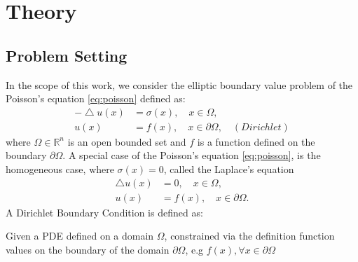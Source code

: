 \chapter{Theory}
\label{chapter:Theory}
%

\section{Problem Setting}
In the scope of this work, we consider the elliptic boundary value problem of
the Poisson's equation
\eqref{eq:poisson} defined as:
  \begin{equation}
    \begin{aligned}
  - \bigtriangleup u(x) &= \sigma(x),\quad x \in \Omega,
  \label{eq:poisson}
  \\ u(x) &= f(x),\quad x \in \partial \Omega, \quad (Dirichlet)
\end{aligned}
\end{equation}
where $\Omega \in \mathbb{R}^{n}$ is an open bounded set and $f$ is a function
defined on the boundary $\partial \Omega$.
A special case of the Poisson's equation \eqref{eq:poisson}, is the homogeneous
case, where $\sigma(x) = 0$, called the Laplace's equation
  \begin{equation}
    \begin{aligned}
    \bigtriangleup u(x) &= 0,\quad x \in \Omega,
  \\ u(x) &= f(x),\quad x \in \partial \Omega\text{.}
    \label{eq:laplace}
  \end{aligned}
  \end{equation}
A Dirichlet Boundary Condition is defined as:
\begin{definition}
Given a \Gls{PDE}
defined on a domain $\Omega$, constrained via the definition function values on the
 boundary of the domain $\partial \Omega$, e.g $f(x), \forall  x \in \partial \Omega$
\end{definition}
